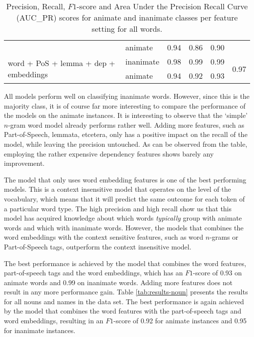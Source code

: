 \documentclass[a4paper,UKenglish]{oasics}
\begin{document}
\begin{table}
\begin{tabular}{llrrrr}
                                                       & animate     &       0.94 &    0.86 &    0.90 &  \\
\multirow{2}{*}{word + PoS + lemma + dep + embeddings} & inanimate     &       0.98 &    0.99 &    0.99 & \multirow{2}{*}{0.97} \\
                                                       & animate     &       0.94 &    0.92 &    0.93 &  \\
\bottomrule
\end{tabular}
\caption{Precision, Recall, $F1$-score and Area Under the Precision Recall Curve (AUC_{PR}) scores for animate and inanimate classes per feature setting for all words.}
\label{tab:results-all}
\end{table}


All models perform well on classifying inanimate words. However, since
this is the majority class, it is of course far more interesting to
compare the performance of the models on the animate instances. It is
interesting to observe that the `simple' $n$-gram word model already
performs rather well. Adding more features, such as Part-of-Speech,
lemmata, etcetera, only has a positive impact on the recall of the
model, while leaving the precision untouched. As can be observed from
the table, employing the rather expensive dependency features shows
barely any improvement.

The model that only uses word embedding features is one of the best
performing models. This is a context insensitive model that operates
on the level of the vocabulary, which means that it will predict the
same outcome for each token of a particular word type. The high
precision and high recall show us that this model has acquired
knowledge about which words \textit{typically} group with animate
words and which with inanimate words. However, the models that combines
the word embeddings with the context sensitive features, such as word
$n$-grams or Part-of-Speech tags, outperform the context insensitive
model.

The best performance is achieved by the model that combines the word
features, part-of-speech tags and the word embeddings, which has an
$F1$-score of 0.93 on animate words and 0.99 on inanimate
words. Adding more features does not result in any more performance
gain.
Table \ref{tab:results-noun} presents the results for all nouns and
names in the data set. The best performance is again achieved by the
model that combines the word features with the part-of-speech tags and
word embeddings, resulting in an $F1$-score of 0.92 for animate
instances and 0.95 for inanimate instances.
\end{document}
